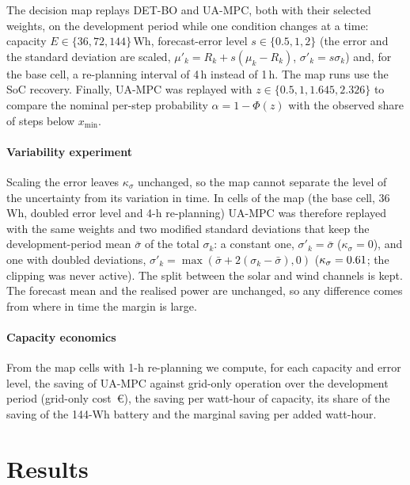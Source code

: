 \documentclass[a4paper,fleqn]{cas-dc}
\newcommand{\DETBO}{DET-BO\xspace}
\newcommand{\UA}{UA-MPC\xspace}
\begin{document}
The decision map replays \DETBO and \UA, both with their selected weights, on the development period while one condition changes at a time: capacity $E\in\{36,72,144\}$\,Wh, forecast-error level $s\in\{0.5,1,2\}$ (the error and the standard deviation are scaled, $\mu'_k=R_k+s(\mu_k-R_k)$, $\sigma'_k=s\sigma_k$) and, for the base cell, a re-planning interval of 4\,h instead of 1\,h. The map runs use the SoC recovery. Finally, \UA was replayed with $z\in\{0.5,1,1.645,2.326\}$ to compare the nominal per-step probability $\alpha=1-\Phi(z)$ with the observed share of steps below $x_{\min}$.

\paragraph{Variability experiment} Scaling the error leaves $\kappa_\sigma$ unchanged, so the map cannot separate the level of the uncertainty from its variation in time. In \varCells cells of the map (the base cell, 36\,Wh, doubled error level and 4-h re-planning) \UA was therefore replayed with the same weights and two modified standard deviations that keep the development-period mean $\bar\sigma$ of the total $\sigma_k$: a constant one, $\sigma'_k=\bar\sigma$ ($\kappa_\sigma=0$), and one with doubled deviations, $\sigma'_k=\max(\bar\sigma+2(\sigma_k-\bar\sigma),0)$ ($\kappa_\sigma=0.61$; the clipping was never active). The split between the solar and wind channels is kept. The forecast mean and the realised power are unchanged, so any difference comes from where in time the margin is large.

\paragraph{Capacity economics} From the map cells with 1-h re-planning we compute, for each capacity and error level, the saving of \UA against grid-only operation over the development period (grid-only cost \gridOnlyDev\,\euro), the saving per watt-hour of capacity, its share of the saving of the 144-Wh battery and the marginal saving per added watt-hour.

\section{Results}\label{sec:results}
\end{document}
